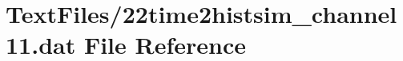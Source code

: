 \hypertarget{22time2histsim__channel11_8dat}{}\section{Text\+Files/22time2histsim\+\_\+channel11.dat File Reference}
\label{22time2histsim__channel11_8dat}
